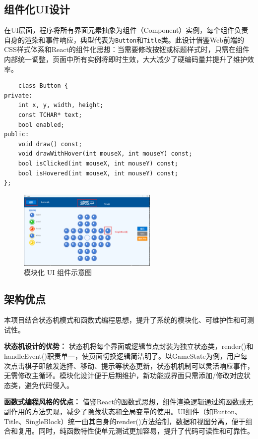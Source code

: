 \documentclass[12pt, a4paper]{article}
\begin{document}
\subsection{组件化UI设计}
在UI层面，程序将所有界面元素抽象为组件（Component）实例，每个组件负责自身的渲染和事件响应，典型代表为\texttt{Button}和\texttt{Title}类。此设计借鉴Web前端的CSS样式体系和React的组件化思想：当需要修改按钮或标题样式时，只需在组件内部统一调整，页面中所有实例将即时生效，大大减少了硬编码量并提升了维护效率。
\begin{lstlisting}
    class Button {
private:
    int x, y, width, height;
    const TCHAR* text;
    bool enabled;
public:
    void draw() const; 
    void drawWithHover(int mouseX, int mouseY) const;
    bool isClicked(int mouseX, int mouseY) const;
    bool isHovered(int mouseX, int mouseY) const;
};
\end{lstlisting}
\begin{figure}[h]
  \centering
  \includegraphics[width=0.6\textwidth]{UIInformation.png}
  \caption{模块化 UI 组件示意图}
  \label{fig:ui-module}
\end{figure}

\subsection{架构优点}
本项目结合状态机模式和函数式编程思想，提升了系统的模块化、可维护性和可测试性。

\textbf{状态机设计的优势：}
状态机将每个界面或逻辑节点封装为独立状态类，render()和handleEvent()职责单一，使页面切换逻辑简洁明了。以GameState为例，用户每次点击棋子即触发选择、移动、提示等状态更新，状态机机制可以灵活响应事件，无需修改主循环。模块化设计便于后期维护，新功能或界面只需添加/修改对应状态类，避免代码侵入。

\textbf{函数式编程风格的优点：}
借鉴React的函数式思想，组件渲染逻辑通过纯函数或无副作用的方法实现，减少了隐藏状态和全局变量的使用。UI组件（如Button、Title、SingleBlock）统一由其自身的render()方法绘制，数据和视图分离，便于组合和复用。同时，纯函数特性使单元测试更加容易，提升了代码可读性和可靠性。
\end{document}
